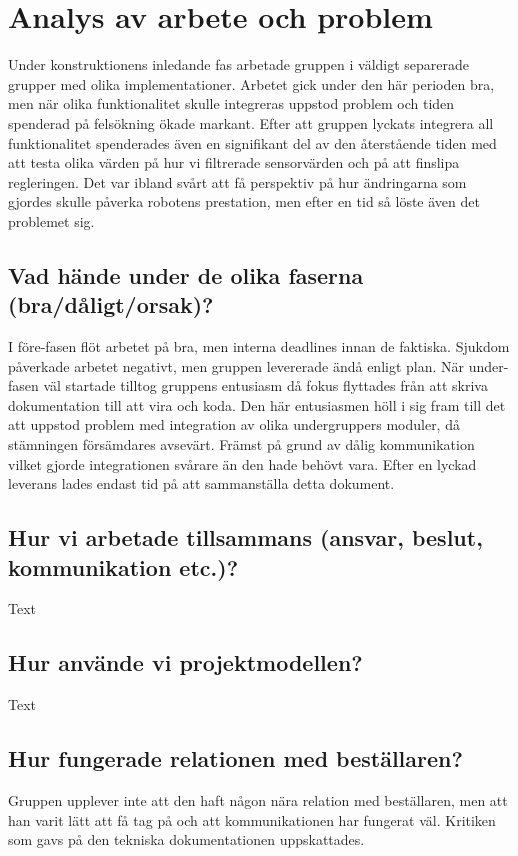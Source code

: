 ﻿\documentclass{article}
\begin{document}
\section{Analys av arbete och problem}
Under konstruktionens inledande fas arbetade gruppen i väldigt separerade grupper med olika implementationer. Arbetet gick under den här perioden bra, men när olika funktionalitet skulle integreras uppstod problem och tiden spenderad på felsökning ökade markant. Efter att gruppen lyckats integrera all funktionalitet spenderades även en signifikant del av den återstående tiden med att testa olika värden på hur vi filtrerade sensorvärden och på att finslipa regleringen. Det var ibland svårt att få perspektiv på hur ändringarna som gjordes skulle påverka robotens prestation, men efter en tid så löste även det problemet sig.

\subsection{Vad hände under de olika faserna (bra/dåligt/orsak)?}
I före-fasen flöt arbetet på bra, men interna deadlines innan de faktiska. Sjukdom påverkade arbetet negativt, men gruppen levererade ändå enligt plan. När under-fasen väl startade tilltog gruppens entusiasm då fokus flyttades från att skriva dokumentation till att vira och koda. Den här entusiasmen höll i sig fram till det att uppstod problem med integration av olika undergruppers moduler, då stämningen försämdares avsevärt. Främst på grund av dålig kommunikation vilket gjorde integrationen svårare än den hade behövt vara. Efter en lyckad leverans lades endast tid på att sammanställa detta dokument.

\subsection{Hur vi arbetade tillsammans (ansvar, beslut, kommunikation etc.)?}
Text

\subsection{Hur använde vi projektmodellen?}
Text

\subsection{Hur fungerade relationen med beställaren?}
Gruppen upplever inte att den haft någon nära relation med beställaren, men att han varit lätt att få tag på och att kommunikationen har fungerat väl. Kritiken som gavs på den tekniska dokumentationen uppskattades. 
\end{document}
